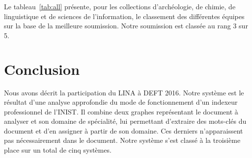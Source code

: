 \documentclass[10pt,twoside]{article}
\begin{document}
        \begin{table}[htb!]
            \centering
            \caption{Classement de DEFT 2016 sur la base des meilleures soumissions pour les collections d'archéologie, de chimie, de linguistique et de sciences de l'information. Notre classement est indiqué en gras.\label{tab:all}}
        \end{table}
        
        Le tableau~\ref{tab:all} présente, pour les collections d'archéologie, de chimie, de linguistique et de sciences de l'information, le classement des différentes équipes sur la base de la meilleure soumission.
        Notre soumission est classée au rang 3 sur 5.
    
    \section{Conclusion}
        Nous avons décrit la participation du LINA à DEFT 2016.
        Notre système est le résultat d'une analyse approfondie du mode de fonctionnement d'un indexeur professionnel de l'INIST.
        Il combine deux graphes représentant le document à analyser et son domaine de spécialité, lui permettant d'extraire des mots-clés du document et d'en assigner à partir de son domaine.
        Ces derniers n'apparaissent pas nécessairement dans le document.
        Notre système s'est classé à la troisième place sur un total de cinq systèmes.
\end{document}

